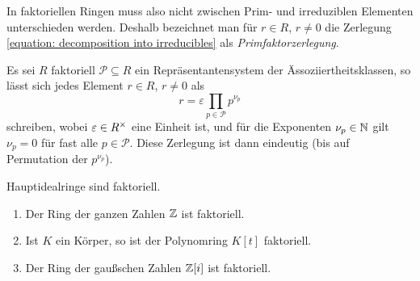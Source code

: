In faktoriellen Ringen muss also nicht zwischen Prim- und irreduziblen Elementen unterschieden werden.
Deshalb bezeichnet man für $r \in R$, $r \neq 0$ die Zerlegung \eqref{equation: decomposition into irreducibles} als \emph{Primfaktorzerlegung}.

\begin{remark}
  Es sei $R$ faktoriell $\mathcal{P} \subseteq R$ ein Repräsentantensystem der Ässoziiertheitsklassen, so lässt sich jedes Element $r \in R$, $r \neq 0$ als
  \[
    r = \varepsilon \prod_{p \in \mathcal{P}} p^{\nu_p}
  \]
  schreiben, wobei $\varepsilon \in R^{\times}$ eine Einheit ist, und für die Exponenten $\nu_p \in \mathbb{N}$ gilt $\nu_p = 0$ für fast alle $p \in \mathcal{P}$.
  Diese Zerlegung ist dann eindeutig (bis auf Permutation der $p^{\nu_p}$).
\end{remark}


\begin{proposition}
  Hauptidealringe sind faktoriell.
\end{proposition}

\begin{example}
  \begin{enumerate}
    \item
      Der Ring der ganzen Zahlen $\mathbb{Z}$ ist faktoriell.
    \item
      Ist $K$ ein Körper, so ist der Polynomring $K[t]$ faktoriell.
    \item
      Der Ring der gaußschen Zahlen $\mathbb{Z}[i]$ ist faktoriell.
  \end{enumerate}
\end{example}

